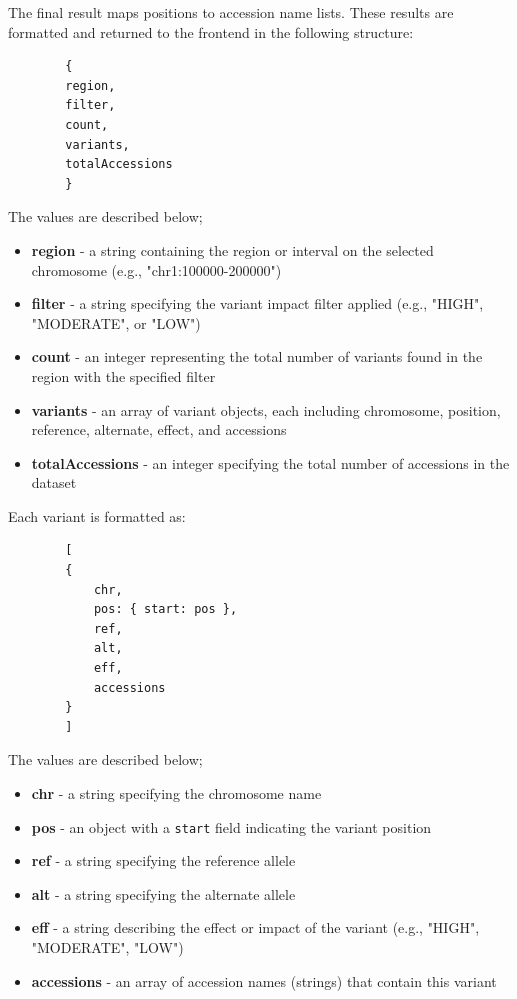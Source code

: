 \documentclass[12pt]{article}
\begin{document}
The final result maps positions to accession name lists. These results are formatted and returned to the frontend in the following structure:

        \begin{verbatim}
        {
        region,
        filter,
        count,
        variants,
        totalAccessions
        }
        \end{verbatim}

The values are described below;

\begin{itemize}
    \item \textbf{region} - a string containing the region or interval on the selected chromosome (e.g., "chr1:100000-200000")
    \item \textbf{filter} - a string specifying the variant impact filter applied (e.g., "HIGH", "MODERATE", or "LOW")
    \item \textbf{count} - an integer representing the total number of variants found in the region with the specified filter
    \item \textbf{variants} - an array of variant objects, each including chromosome, position, reference, alternate, effect, and accessions
    \item \textbf{totalAccessions} - an integer specifying the total number of accessions in the dataset
\end{itemize}

Each variant is formatted as:

        \begin{verbatim}
        [
        {
            chr,
            pos: { start: pos },
            ref,
            alt,
            eff,
            accessions
        }
        ]
        \end{verbatim}

The values are described below;

\begin{itemize}
    \item \textbf{chr} - a string specifying the chromosome name
    \item \textbf{pos} - an object with a \texttt{start} field indicating the variant position
    \item \textbf{ref} - a string specifying the reference allele
    \item \textbf{alt} - a string specifying the alternate allele
    \item \textbf{eff} - a string describing the effect or impact of the variant (e.g., "HIGH", "MODERATE", "LOW")
    \item \textbf{accessions} - an array of accession names (strings) that contain this variant
\end{itemize}
\end{document}
